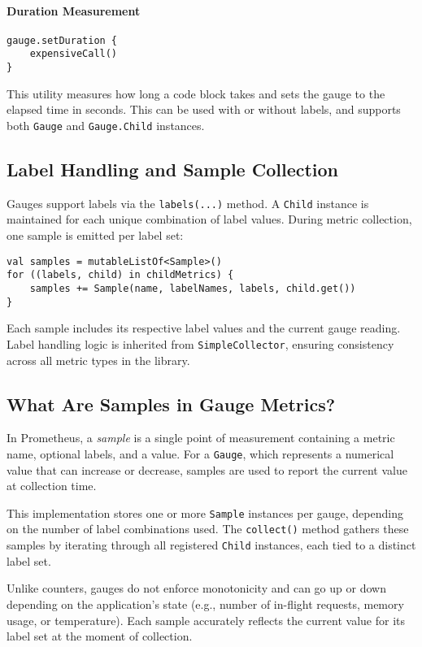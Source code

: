 \paragraph{Duration Measurement}

\begin{verbatim}
gauge.setDuration {
    expensiveCall()
}
\end{verbatim}

This utility measures how long a code block takes and sets the gauge to the elapsed time in seconds. This can be used with or without labels, and supports both \texttt{Gauge} and \texttt{Gauge.Child} instances.

\subsection{Label Handling and Sample Collection}
Gauges support labels via the \texttt{labels(...)} method. A \texttt{Child} instance is maintained for each unique combination of label values. During metric collection, one sample is emitted per label set:

\begin{verbatim}
val samples = mutableListOf<Sample>()
for ((labels, child) in childMetrics) {
    samples += Sample(name, labelNames, labels, child.get())
}
\end{verbatim}

Each sample includes its respective label values and the current gauge reading. Label handling logic is inherited from \texttt{SimpleCollector}, ensuring consistency across all metric types in the library.

\subsection{What Are Samples in Gauge Metrics?}

In Prometheus, a \textit{sample} is a single point of measurement containing a metric name, optional labels, and a value. For a \texttt{Gauge}, which represents a numerical value that can increase or decrease, samples are used to report the current value at collection time.

This implementation stores one or more \texttt{Sample} instances per gauge, depending on the number of label combinations used. The \texttt{collect()} method gathers these samples by iterating through all registered \texttt{Child} instances, each tied to a distinct label set.

Unlike counters, gauges do not enforce monotonicity and can go up or down depending on the application's state (e.g., number of in-flight requests, memory usage, or temperature). Each sample accurately reflects the current value for its label set at the moment of collection.

